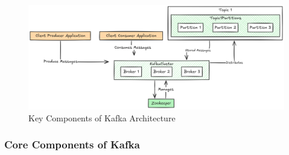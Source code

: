 \documentclass[10pt , a4paper]{report}
\begin{document}
\begin{figure}[htbp]
    \centering
    \includegraphics[width=1\linewidth]{imgs/KafkaStructureModel.png}
    \caption{Key Components of Kafka Architecture}
    \label{fig:kafka_arch}
\end{figure}

\subsubsection*{Core Components of Kafka}
\end{document}

